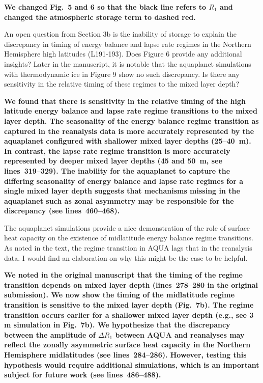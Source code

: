 \documentclass{article}
\begin{document}
\textbf{We changed Fig.~5 and 6 so that the black line refers to $R_1$ and changed the atmospheric storage term to dashed red.}

An open question from Section 3b is the inability of storage to explain the discrepancy in timing of energy balance and lapse rate regimes in the Northern Hemisphere high latitudes (L191-193). Does Figure 6 provide any additional insights? Later in the manuscript, it is notable that the aquaplanet simulations with thermodynamic ice in Figure 9 show no such discrepancy. Is there any sensitivity in the relative timing of these regimes to the mixed layer depth?

%
\textbf{We found that there is sensitivity in the relative timing of the high latitude energy balance and lapse rate regime transitions to the mixed layer depth. The seasonality of the energy balance regime transition as captured in the reanalysis data is more accurately represented by the aquaplanet configured with shallower mixed layer depths (25--40~m). In contrast, the lapse rate regime transition is more accurately represented by deeper mixed layer depths (45 and 50~m, see lines~319--329). The inability for the aquaplanet to capture the differing seasonality of energy balance and lapse rate regimes for a single mixed layer depth suggests that mechanisms missing in the aquaplanet such as zonal asymmetry may be responsible for the discrepancy (see lines~460--468).}

The aquaplanet simulations provide a nice demonstration of the role of surface heat capacity on the existence of midlatitude energy balance regime transitions. As noted in the text, the regime transition in AQUA lags that in the reanalysis data. I would find an elaboration on why this might be the case to be helpful.

\textbf{We noted in the original manuscript that the timing of the regime transition depends on mixed layer depth (lines~278--280 in the original submission). We now show the timing of the midlatitude regime transition is sensitive to the mixed layer depth (Fig.~7b). The regime transition occurs earlier for a shallower mixed layer depth (e.g., see 3 m simulation in Fig.~7b). We hypothesize that the discrepancy between the amplitude of $\Delta R_1$ between AQUA and reanalyses may reflect the zonally asymmetric surface heat capacity in the Northern Hemisphere midlatitudes (see lines~284--286). However, testing this hypothesis would require additional simulations, which is an important subject for future work (see lines~486--488).}
\end{document}
